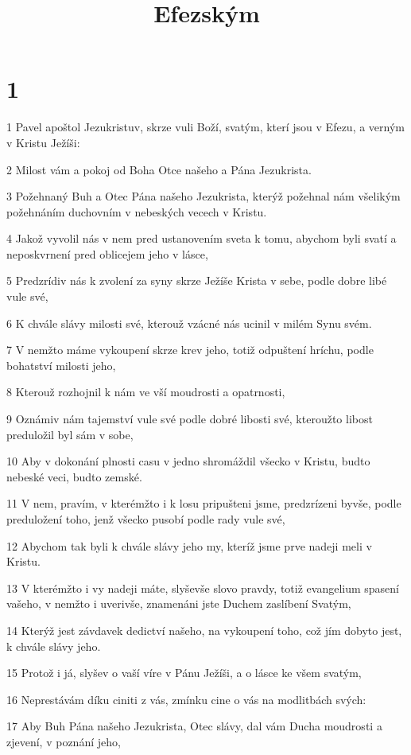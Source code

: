 

\title{Efezským}

\chapter{1}

\par 1 Pavel apoštol Jezukristuv, skrze vuli Boží, svatým, kterí jsou v Efezu, a verným v Kristu Ježíši:
\par 2 Milost vám a pokoj od Boha Otce našeho a Pána Jezukrista.
\par 3 Požehnaný Buh a Otec Pána našeho Jezukrista, kterýž požehnal nám všelikým požehnáním duchovním v nebeských vecech v Kristu.
\par 4 Jakož vyvolil nás v nem pred ustanovením sveta k tomu, abychom byli svatí a neposkvrnení pred oblicejem jeho v lásce,
\par 5 Predzrídiv nás k zvolení za syny skrze Ježíše Krista v sebe, podle dobre libé vule své,
\par 6 K chvále slávy milosti své, kterouž vzácné nás ucinil v milém Synu svém.
\par 7 V nemžto máme vykoupení skrze krev jeho, totiž odpuštení hríchu, podle bohatství milosti jeho,
\par 8 Kterouž rozhojnil k nám ve vší moudrosti a opatrnosti,
\par 9 Oznámiv nám tajemství vule své podle dobré libosti své, kteroužto libost preduložil byl sám v sobe,
\par 10 Aby v dokonání plnosti casu v jedno shromáždil všecko v Kristu, budto nebeské veci, budto zemské.
\par 11 V nem, pravím, v kterémžto i k losu pripušteni jsme, predzrízeni byvše, podle preduložení toho, jenž všecko pusobí podle rady vule své,
\par 12 Abychom tak byli k chvále slávy jeho my, kteríž jsme prve nadeji meli v Kristu.
\par 13 V kterémžto i vy nadeji máte, slyševše slovo pravdy, totiž evangelium spasení vašeho, v nemžto i uverivše, znamenáni jste Duchem zaslíbení Svatým,
\par 14 Kterýž jest závdavek dedictví našeho, na vykoupení toho, což jím dobyto jest, k chvále slávy jeho.
\par 15 Protož i já, slyšev o vaší víre v Pánu Ježíši, a o lásce ke všem svatým,
\par 16 Neprestávám díku ciniti z vás, zmínku cine o vás na modlitbách svých:
\par 17 Aby Buh Pána našeho Jezukrista, Otec slávy, dal vám Ducha moudrosti a zjevení, v poznání jeho,
